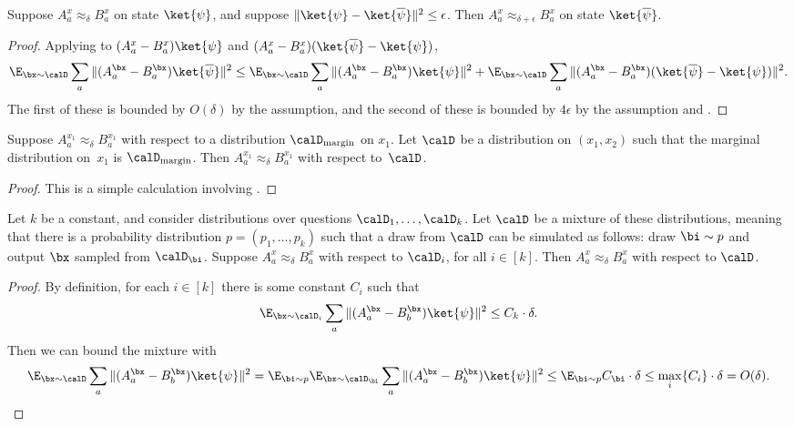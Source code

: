 \begin{fact}\label{fact:the-ol-state-y-swaperoonie}
Suppose $A_a^x \approx_{\delta} B_a^x$ on state $\ket{\psi}$, and suppose $\Vert \ket{\psi} - \ket{\overline{\psi}} \Vert^2 \leq \epsilon$.
Then $A_a^x \approx_{\delta+\epsilon} B_a^x$ on state $\ket{\overline{\psi}}$.
\end{fact}
\begin{proof}
Applying  to $(A_{a}^{x} - B_{a}^{x} ) \ket{\psi}$ and $(A_{a}^{x} - B_{a}^{x} ) (\ket{\overline{\psi}} - \ket{\psi})$,
\begin{equation*}
\E_{\bx \sim \calD} \sum_a \Vert (A_{a}^{\bx} - B_{a}^{\bx} ) \ket{\overline{\psi}}\Vert^2
\leq \E_{\bx \sim \calD} \sum_a \Vert (A_{a}^{\bx} - B_{a}^{\bx} ) \ket{\psi}\Vert^2 + \E_{\bx \sim \calD} \sum_a \Vert (A_{a}^{\bx} - B_{a}^{\bx} ) (\ket{\overline{\psi}}-\ket{\psi})\Vert^2.
\end{equation*}
The first of these is bounded by $O(\delta)$ by the assumption, and the second of these is bounded by $4\epsilon$ by the assumption and .
\end{proof}

\begin{fact}\label{fact:close-on-marginal}
Suppose $A_a^{x_1} \approx_{\delta} B_a^{x_1}$ with respect to a distribution $\calD_{\mathrm{margin}}$ on $x_1$.
Let $\calD$ be a distribution on $(x_1, x_2)$ such that the marginal distribution on~$x_1$ is $\calD_{\mathrm{margin}}$.
Then $A_a^{x_1} \approx_{\delta} B_a^{x_1}$ with respect to~$\calD$.
\end{fact}
\begin{proof}
This is a simple calculation involving .
\end{proof}

\begin{fact}\label{fact:average-over-dists}
Let $k$ be a constant, and consider distributions over questions $\calD_1, \ldots, \calD_k$.
Let $\calD$ be a mixture of these distributions,
meaning that there is a probability distribution $p = (p_1, \ldots, p_k)$
such that a draw from $\calD$ can be simulated as follows: draw $\bi \sim p$ and output $\bx$ sampled from $\calD_{\bi}$.
Suppose $A^x_a \approx_{\delta} B^{x}_a$ with respect to $\calD_i$, for all $i \in [k]$.
Then $A^x_a \approx_{\delta} B^{x}_a$ with respect to $\calD$.
\end{fact}
\begin{proof}
By definition, for each $i \in [k]$ there is some constant $C_i$ such that 
\begin{equation*}
\E_{\bx \sim \calD_i} \sum_{a} \Vert (A^{\bx}_a - B^{\bx}_b) \ket{\psi} \Vert^2 \leq C_k \cdot \delta.
\end{equation*}
Then we can bound the mixture with
\begin{equation*}
\E_{\bx \sim \calD} \sum_{a} \Vert (A^{\bx}_a - B^{\bx}_b) \ket{\psi} \Vert^2
= \E_{\bi \sim p} \E_{\bx \sim \calD_{\bi}} \sum_{a} \Vert (A^{\bx}_a - B^{\bx}_b) \ket{\psi} \Vert^2
\leq \E_{\bi \sim p} C_{\bi} \cdot \delta \leq \max_{i}\{C_i\} \cdot \delta = O(\delta).\qedhere
\end{equation*}
\end{proof}

